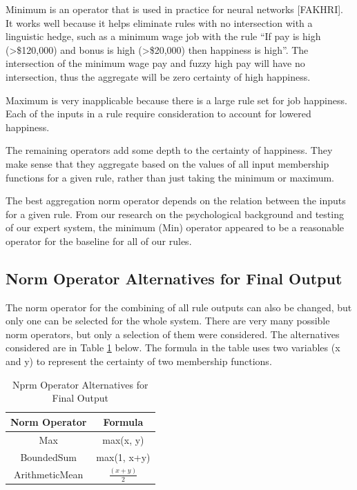 \documentclass[12pt,fleqn,reqno,letterpaper]{article}
\begin{document}
Minimum is an operator that is used in practice for neural networks [FAKHRI]. It works well because it helps eliminate rules with no intersection with a linguistic hedge, such as a minimum wage job with the rule “If pay is high (>\$120,000) and bonus is high (>\$20,000) then happiness is high”. The intersection of the minimum wage pay and fuzzy high pay will have no intersection, thus the aggregate will be zero certainty of high happiness.

Maximum is very inapplicable because there is a large rule set for job happiness. Each of the inputs in a rule require consideration to account for lowered happiness.

The remaining operators add some depth to the certainty of happiness. They make sense that they aggregate based on the values of all input membership functions for a given rule, rather than just taking the minimum or maximum.

The best aggregation norm operator depends on the relation between the inputs for a given rule. From our research on the psychological background and testing of our expert system, the minimum (Min) operator appeared to be a reasonable operator for the baseline for all of our rules.

\subsection{Norm Operator Alternatives for Final Output}
The norm operator for the combining of all rule outputs can also be changed, but only one can be selected for the whole system. There are very many possible norm operators, but only a selection of them were considered. The alternatives considered are in Table \ref{tbl:FINAL-NORM} below. The formula in the table uses two variables (x and y) to represent the certainty of two membership functions.

\begin{table}[h]
\caption{Nprm Operator Alternatives for Final Output}
\label{tbl:FINAL-NORM}
\centering
\begin{tabular}{|c|c|}
\hline
\textbf{Norm Operator} & \textbf{Formula}  \\ \hline
Max                    & max(x, y)         \\ \hline
BoundedSum             & max(1, x+y)       \\ \hline
ArithmeticMean         & $\frac{(x+y)}{2}$ \\ \hline
\end{tabular}
\end{table}
\end{document}
